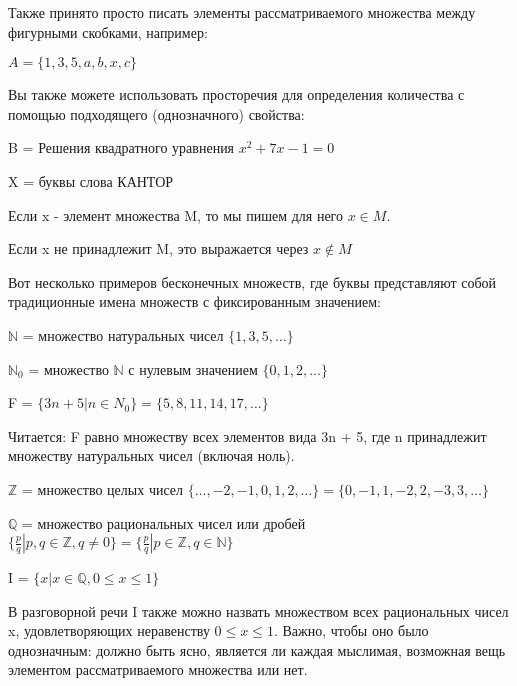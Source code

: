 Также принято просто писать элементы рассматриваемого множества между фигурными скобками, например:

\vspace{0.5cm}
\(A = \{1,3,5,a,b,x,c\}\)
\vspace{0.5cm}

Вы также можете использовать просторечия для определения количества с помощью подходящего (однозначного) свойства:

\vspace{0.5cm}
B = Решения квадратного уравнения \(x^2+7x-1=0\)

X = буквы слова КАНТОР
\vspace{0.5cm}

Если x - элемент множества M, то мы пишем для него \(x \in M\).

Если x не принадлежит M, это выражается через \(x \notin M\)
\vspace{0.5cm}

Вот несколько примеров бесконечных множеств, где буквы представляют собой традиционные имена множеств с фиксированным значением:

\vspace{0.5cm}
\(\mathbb{N}\) = множество натуральных чисел \(\{1,3,5,\dots\}\)

\(\mathbb{N}_0\) = множество \(\mathbb{N}\) с нулевым значением \(\{0,1,2,\dots\}\)

F = \(\{3n + 5|n \in N_0\}=\{5,8,11,14,17,\dots\}\)
\vspace{0.5cm}

Читается: F равно множеству всех элементов вида 3n + 5, где n принадлежит множеству натуральных чисел (включая ноль).

\vspace{0.5cm}
\(\mathbb{Z}\) = множество целых чисел \(\{\dots,-2,-1,0,1,2,\dots\}=\{0,-1,1,-2,2,-3,3,\dots\}\)

\(\mathbb{Q}\) = множество рациональных чисел или дробей \(\{\frac{p}{q}|p,q \in \mathbb{Z},q \neq 0\}=\{\frac{p}{q}|p \in \mathbb{Z},q \in \mathbb{N}\}\)

I = \(\{x|x \in \mathbb{Q}, 0 \le x \le 1\}\)
\vspace{0.5cm}

В разговорной речи I также можно назвать множеством всех рациональных чисел x, удовлетворяющих неравенству \(0 \le x \le 1\).
Важно, чтобы оно было однозначным: должно быть ясно, является ли каждая мыслимая, возможная вещь элементом рассматриваемого множества или нет.

